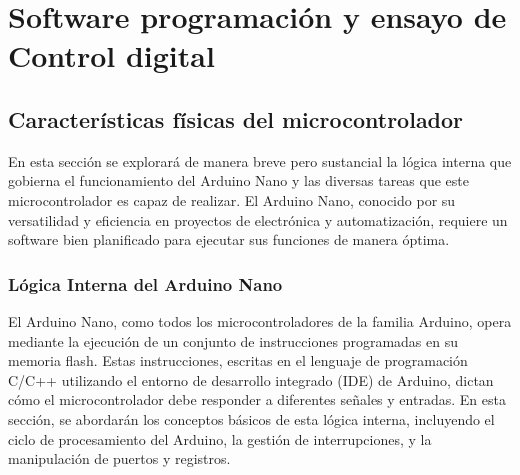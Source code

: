 \chapter{Software programación y ensayo de Control digital}

\label{C:Software programación y ensayo de Control digital}

\section{Características físicas del microcontrolador}
En esta sección se explorará de manera breve pero sustancial la lógica interna que gobierna el funcionamiento del Arduino Nano y las diversas tareas que este microcontrolador es capaz de realizar. El Arduino Nano, conocido por su versatilidad y eficiencia en proyectos de electrónica y automatización, requiere un software bien planificado para ejecutar sus funciones de manera óptima.

\subsection{Lógica Interna del Arduino Nano}
El Arduino Nano, como todos los microcontroladores de la familia Arduino, opera mediante la ejecución de un conjunto de instrucciones programadas en su memoria flash. Estas instrucciones, escritas en el lenguaje de programación C/C++ utilizando el entorno de desarrollo integrado (IDE) de Arduino, dictan cómo el microcontrolador debe responder a diferentes señales y entradas. En esta sección, se abordarán los conceptos básicos de esta lógica interna, incluyendo el ciclo de procesamiento del Arduino, la gestión de interrupciones, y la manipulación de puertos y registros.

